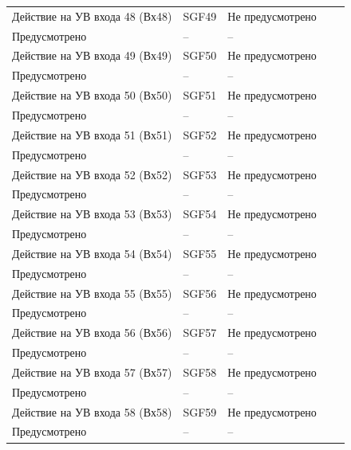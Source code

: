 \begin{longtable}{|>{\centering\arraybackslash}m{5.3cm}|>{\centering\arraybackslash}m{3.3cm}|>{\centering\arraybackslash}m{4.2cm}|>{\centering\arraybackslash}m{1.8cm}|>{\centering\arraybackslash}m{1cm}|}
\hline
\centering Действие на УВ входа 48 (Вх48)  & \centering SGF49 & \centering Не предусмотрено \\ Предусмотрено & \centering -- & \centering \arraybackslash -- \\
\hline
\centering Действие на УВ входа 49 (Вх49)  & \centering SGF50 & \centering Не предусмотрено \\ Предусмотрено & \centering -- & \centering \arraybackslash -- \\
\hline
\centering Действие на УВ входа 50 (Вх50)  & \centering SGF51 & \centering Не предусмотрено \\ Предусмотрено & \centering -- & \centering \arraybackslash -- \\
\hline
\centering Действие на УВ входа 51 (Вх51)  & \centering SGF52 & \centering Не предусмотрено \\ Предусмотрено & \centering -- & \centering \arraybackslash -- \\
\hline
\centering Действие на УВ входа 52 (Вх52)  & \centering SGF53 & \centering Не предусмотрено \\ Предусмотрено & \centering -- & \centering \arraybackslash -- \\
\hline
\centering Действие на УВ входа 53 (Вх53)  & \centering SGF54 & \centering Не предусмотрено \\ Предусмотрено & \centering -- & \centering \arraybackslash -- \\
\hline
\centering Действие на УВ входа 54 (Вх54)  & \centering SGF55 & \centering Не предусмотрено \\ Предусмотрено & \centering -- & \centering \arraybackslash -- \\
\hline
\centering Действие на УВ входа 55 (Вх55)  & \centering SGF56 & \centering Не предусмотрено \\ Предусмотрено & \centering -- & \centering \arraybackslash -- \\
\hline
\centering Действие на УВ входа 56 (Вх56)  & \centering SGF57 & \centering Не предусмотрено \\ Предусмотрено & \centering -- & \centering \arraybackslash -- \\
\hline
\centering Действие на УВ входа 57 (Вх57)  & \centering SGF58 & \centering Не предусмотрено \\ Предусмотрено & \centering -- & \centering \arraybackslash -- \\
\hline
\centering Действие на УВ входа 58 (Вх58)  & \centering SGF59 & \centering Не предусмотрено \\ Предусмотрено & \centering -- & \centering \arraybackslash -- \\

\end{longtable}
